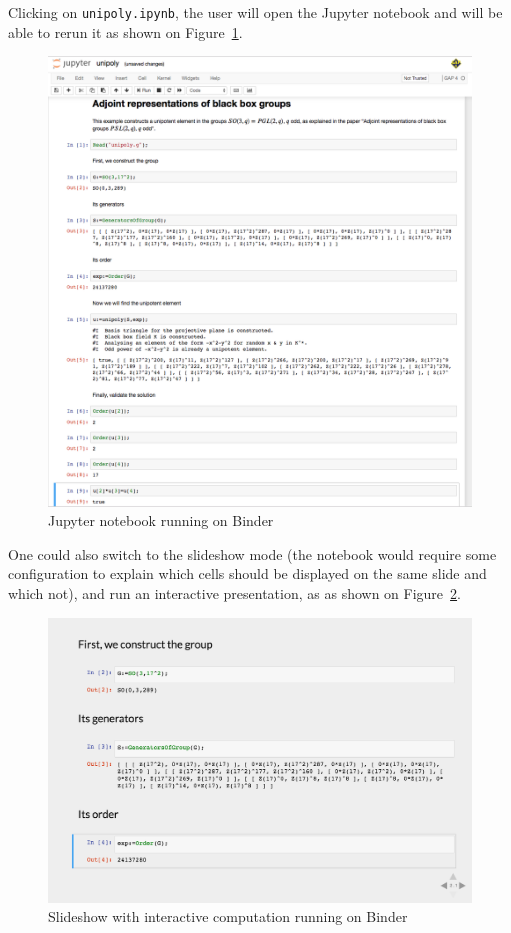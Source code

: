 \documentclass{deliverablereport}
\begin{document}
Clicking on {\tt unipoly.ipynb}, the user will open the Jupyter notebook
and will be able to rerun it as shown on Figure~\ref{fig:unipoly-notebook}.

\begin{figure}[!ht]
    \centering
    \includegraphics[width=\textwidth]{images/unipoly-notebook}
    \caption{Jupyter notebook running on Binder}
    \label{fig:unipoly-notebook}
\end{figure}

One could also switch to the slideshow mode (the notebook would require
some configuration to explain which cells should be displayed on the
same slide and which not), and run an interactive presentation, as
as shown on Figure~\ref{fig:unipoly-slide}.

\begin{figure}[!ht]
    \centering
    \includegraphics[width=\textwidth]{images/unipoly-slide}
    \caption{Slideshow with interactive computation running on Binder}
    \label{fig:unipoly-slide}
\end{figure}
\end{document}
